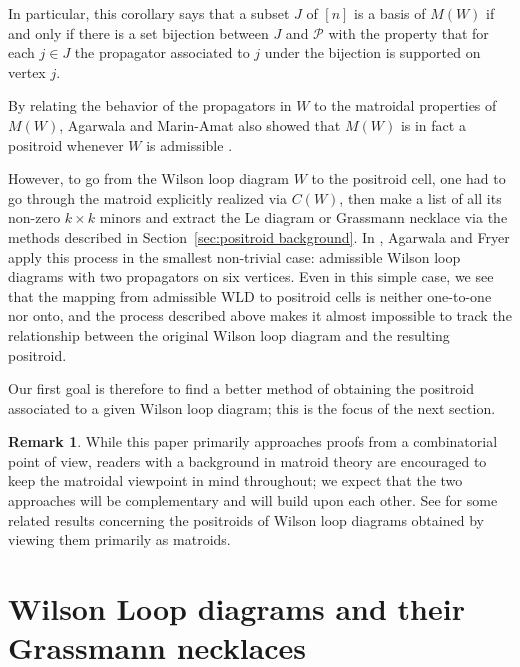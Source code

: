 \documentclass[11pt]{article}
\newcommand{\cP}{\mathcal{P}}
\theoremstyle{remark}
\theoremstyle{definition}
\newtheorem{rmk}[thm]{Remark}
\begin{document}
In particular, this corollary says that a subset $J$ of $[n]$ is a basis of $M(W)$ if and only if there is a set bijection between $J$ and $\cP$ with the property that for each $j\in J$ the propagator associated to $j$ under the bijection is supported on vertex $j$.


By relating the behavior of the propagators in $W$ to the matroidal properties of $M(W)$, Agarwala and Marin-Amat also showed that $M(W)$ is in fact a positroid whenever $W$ is admissible \cite[Corollary 3.39]{wilsonloop}.

However, to go from the Wilson loop diagram $W$ to the positroid cell, one had to go through the matroid explicitly realized via $C(W)$, then make a list of all its non-zero $k\times k$ minors and extract the Le diagram or Grassmann necklace via the methods described in Section~\ref{sec:positroid background}. In \cite{casestudy}, Agarwala and Fryer apply this process in the smallest non-trivial case: admissible Wilson loop diagrams with two propagators on six vertices. Even in this simple case, we see that the mapping from admissible WLD to positroid cells is neither one-to-one nor onto, and the process described above makes it almost impossible to track the relationship between the original Wilson loop diagram and the resulting positroid.

Our first goal is therefore to find a better method of obtaining the positroid associated to a given Wilson loop diagram; this is the focus of the next section.

\begin{rmk}
While this paper primarily approaches proofs from a combinatorial point of view, readers with a background in matroid theory are encouraged to keep the matroidal viewpoint in mind throughout; we expect that the two approaches will be complementary and will build upon each other. See \cite{generalcombinatoricsI} for some related results concerning the positroids of Wilson loop diagrams obtained by viewing them primarily as matroids.
\end{rmk}




\section{Wilson Loop diagrams and their Grassmann necklaces}\label{sec GN algorithm}
\end{document}
